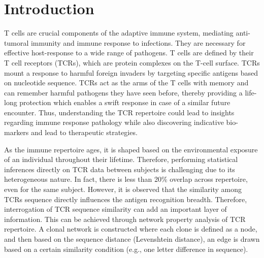 \chapter{Introduction}


T cells are crucial components of the adaptive immune system, mediating anti-tumoral immunity and immune response to infections. They are necessary for effective host-response to a wide range of pathogens. T cells are defined by their T cell receptors (TCRs), which are protein complexes on the T-cell surface. TCRs mount a response to harmful foreign invaders by targeting specific antigens based on nucleotide sequence. TCRs act as the arms of the T cells with memory and can remember harmful pathogens they have seen before, thereby providing a life-long protection which enables a swift response in case of a similar future encounter. Thus, understanding the TCR repertoire could lead to insights regarding immune response pathology while also discovering indicative bio-markers and lead to therapeutic strategies.\par

As the immune repertoire ages, it is shaped based on the environmental exposure of an individual throughout their lifetime. Therefore, performing statistical inferences directly on TCR data between subjects is challenging due to its heterogeneous nature. In fact, there is less than 20\% overlap across repertoire, even for the same subject. However, it is observed that the similarity among TCRs sequence directly influences the antigen recognition breadth. Therefore, interrogation of TCR sequence similarity can add an important layer of information. This can be achieved through network property analysis of TCR repertoire. A clonal network is constructed where each clone is defined as a node, and then based on the sequence distance (Levenshtein distance), an edge is drawn based on a certain similarity condition (e.g., one letter difference in sequence).\par

